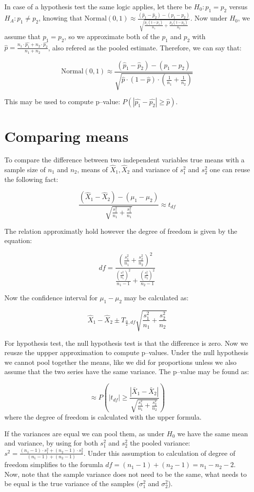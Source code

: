 In case of a hypothesis test the same logic applies, let there be $H_0: p_1 =
	p_2$ versus $H_A: p_1 \neq p_2$, knowing that $ \mbox{Normal}(0,1) \approx
	\frac{(\hat{p}_1 - \hat{p}_2) - (p_1 -
		p_2)}{\sqrt{\frac{p_1(1-p_1)}{n_1}+\frac{p_2(1-p_2)}{n_2}}}$. Now under $H_0$,
we assume that $p_1=p_2$, so we approximate both of the $p_1$ and $p_2$ with
$\hat{p}=\frac{n_1\cdot \hat{p_1} + n_2 \cdot \hat{p_2}}{n_1 + n_2}$, also
refered as the pooled estimate. Therefore, we can say that:

\[ \mbox{Normal}(0,1) \approx \frac{(\hat{p}_1 - \hat{p}_2) - (p_1 -
		p_2)}{\sqrt{\hat{p}\cdot(1-\hat{p})\cdot\left(\frac{1}{n_1} +
			\frac{1}{n_2}\right)}}
\]

This may be used to compute p--value: $P(|\hat{p_1}-\hat{p_2}| \geq \hat{p})$.

\section{Comparing means}

To compare the difference between two independent variables true means with a
sample size of $n_1$ and $n_2$, means of $\hat{X}_1, \hat{X}_2$ and variance of
$s_1^2$ and $s_2^2$ one can reuse the following fact:

\[
	\frac{(\hat{X}_1-\hat{X}_2)-(\mu_1-\mu_2)}{\sqrt{\frac{s_1^2}{n_1}+\frac{s_1^2}{n_1}}}
	\approx t_{df}
\]

The relation approximatly hold however the degree of freedom is given by the
equation:

\[ df = \frac{\left(\frac{s_1^2 }{n_1} + \frac{s_2^2 }{n_2} \right)^2} {
		\frac{\left(\frac{s_1^2 }{n_1}\right)^2}{n_1-1} + \frac{\left(\frac{s_2^2
			}{n_2}\right)^2}{n_2-1} }
\]

Now the confidence interval for $\mu_1-\mu_2$ may be calculated as:

\[ \hat{X}_1 - \hat{X}_2 \pm T_{\frac{\alpha}{2}, df} \sqrt{\frac{s_1^2}{n_1}
		+ \frac{s_2^2}{n_2}}
\]

For hypothesis test, the null hypothesis test is that the difference is zero.
Now we reusze the uppper approximation to compute p--values. Under the null
hypothesis we cannot pool together the means, like we did for proportions unless
we also assume that the two series have the same variance. The p--value may be
found as:

\[ \approx P \left( |t_{df}| \geq
	\frac{|\bar{X}_1-\bar{X}_2|}{\sqrt{\frac{s_1^2}{n_1} + \frac{s_2^2}{n_2}}} \right)
\] where the degree of freedom is calculated with the upper formula.

If the variances are equal we can pool them, as under $H_0$ we have the same
mean and variance, by using for both $s_1^2$ and $s_2^2$ the pooled variance:
$s^2 = \frac{(n_1-1)\cdot s_1^2 + (n_2-1)\cdot s_2^2}{(n_1-1)+
		(n_2-1)}$. Under this assumption to calculation of degree of freedom simplifies
to the forumla $df = (n_1-1)+(n_2-1) = n_1 - n_2 - 2$. Now, note that the
sample variance does not need to be the same, what needs to be equal is the true
variance of the samples ($\sigma_1^2$ and $\sigma_2^2$).
